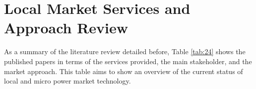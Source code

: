 \section{Local Market Services and Approach Review} \label{sec:servicesreview}
As a summary of the literature review detailed before, Table \ref{tab:24} shows the published papers in terms of the services provided, the main stakeholder, and the market approach. This table aims to show an overview of the current status of local and micro power market technology.
